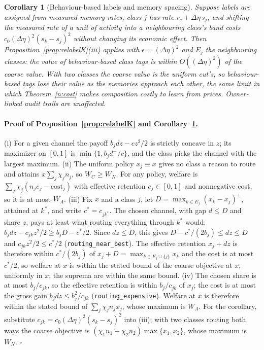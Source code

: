\documentclass[12pt]{article}
\newtheorem{corollary}[theorem]{Corollary}
\theoremstyle{definition}
\theoremstyle{remark}
\begin{document}
\begin{corollary}[Behaviour-based labels and memory spacing]\label{cor:relabelspacing}
Suppose labels are assigned from measured memory rates, class $j$ has rate $r_c+\Delta\eta\,s_j$, and shifting the measured rate of a unit of activity into a neighbouring class's band costs $c_0(\Delta\eta)^2(s_k-s_j)^2$ without changing its economic effect. Then Proposition~\ref{prop:relabelK}(iii) applies with $\epsilon=(\Delta\eta)^2$ and $E_j$ the neighbouring classes: the value of behaviour-based class tags is within $O((\Delta\eta)^2)$ of the coarse value. With two classes the coarse value is the uniform cut's, so behaviour-based tags lose their value as the memories approach each other, the same limit in which Theorem~\ref{n:cost} makes composition costly to learn from prices. Owner-linked audit trails are unaffected.
\end{corollary}

\paragraph{Proof of Proposition~\ref{prop:relabelK} and Corollary~\ref{cor:relabelspacing}.} (i) For a given channel the payoff $b_jdz-cz^2/2$ is strictly concave in $z$; its maximizer on $[0,1]$ is $\min\{1,b_jd^+/c\}$, and the class picks the channel with the largest maximum. (ii) The uniform policy $x_j\equiv x$ gives no class a reason to route and attains $x\sum_j\chi_jn_j$, so $W_C\ge W_N$. For any policy, welfare is $\sum_j\chi_j(n_je_j-\text{cost}_j)$ with effective retention $e_j\in[0,1]$ and nonnegative cost, so it is at most $W_A$. (iii) Fix $x$ and a class $j$, let $D=\max_{k\in E_j}(x_k-x_j)^+$, attained at $k^*$, and write $c^*=c_{jk^*}$. The chosen channel, with gap $d\le D$ and share $z$, pays at least what routing everything through $k^*$ would: $b_jdz-c_{jk}z^2/2\ge b_jD-c^*/2$. Since $dz\le D$, this gives $D-c^*/(2b_j)\le dz\le D$ and $c_{jk}z^2/2\le c^*/2$ (\nolinkurl{routing_near_best}). The effective retention $x_j+dz$ is therefore within $c^*/(2b_j)$ of $x_j+D=\max_{k\in E_j\cup\{j\}}x_k$ and the cost is at most $c^*/2$, so welfare at $x$ is within the stated bound of the coarse objective at $x$, uniformly in $x$; the suprema are within the same bound. (iv) The chosen share is at most $b_j/c_{jk}$, so the effective retention is within $b_j/c_{jk}$ of $x_j$; the cost is at most the gross gain $b_jdz\le b_j^2/c_{jk}$ (\nolinkurl{routing_expensive}). Welfare at $x$ is therefore within the stated bound of $\sum_j\chi_jn_jx_j$, whose maximum is $W_A$. For the corollary, substitute $c_{jk}=c_0(\Delta\eta)^2(s_k-s_j)^2$ into (iii); with two classes routing both ways the coarse objective is $(\chi_1n_1+\chi_2n_2)\max\{x_1,x_2\}$, whose maximum is $W_N$. $\square$
\end{document}
